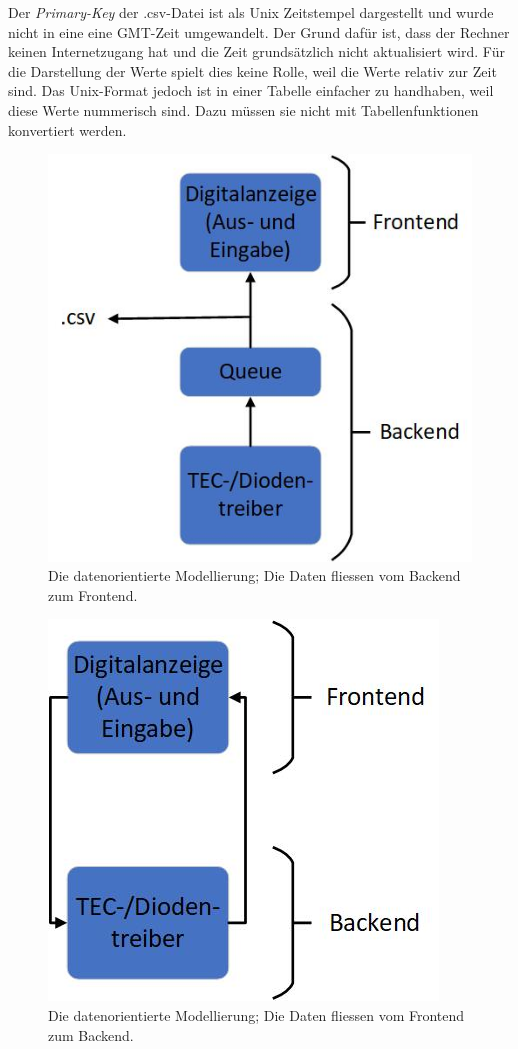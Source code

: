 Der \textit{Primary-Key} der .csv-Datei ist als Unix Zeitstempel dargestellt und wurde nicht in eine eine GMT-Zeit umgewandelt. Der Grund dafür ist, dass der Rechner keinen Internetzugang hat und die Zeit grundsätzlich nicht aktualisiert wird. Für die Darstellung der Werte spielt dies keine Rolle, weil die Werte relativ zur Zeit sind. Das Unix-Format jedoch ist in einer Tabelle einfacher zu handhaben, weil diese Werte nummerisch sind. Dazu müssen sie nicht mit Tabellenfunktionen konvertiert werden.\\

\begin{figure}[H]
    \centering
    \includegraphics[scale=0.5]{98_images/data_oriented_back_front.jpg}
    \caption{Die datenorientierte Modellierung; Die Daten fliessen vom Backend zum Frontend.}
    \label{fig:dataflow_1}
\end{figure}

\begin{figure}[H]
    \centering
    \includegraphics[scale=0.5]{98_images/data_oriented_front_back.jpg}
    \caption{Die datenorientierte Modellierung; Die Daten fliessen vom Frontend zum Backend.}
    \label{fig:dataflow_2}
\end{figure}


